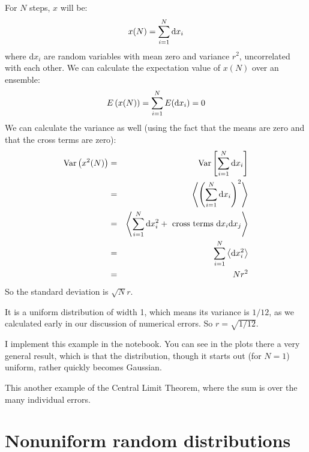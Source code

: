 
\begin{answer}
  For $N$ steps, $x$ will be:
  \begin{equation}
    x(N) = \sum_{i=1}^{N} {\rm d}x_i
  \end{equation}
  where d$x_i$ are random variables with mean zero and variance $r^2$,
  uncorrelated with each other. We can calculate the expectation value
  of $x(N)$ over an ensemble:
  \begin{equation}
    E\left(x(N)\right) = \sum_{i=1}^{N} E({\rm d}x_i) = 0
  \end{equation}
  We can calculate the variance as well (using the fact that the means
  are zero and that the cross terms are zero):
  \begin{eqnarray}
    {\rm Var}\left(x^2(N)\right)
    &=& {\rm Var}\left[\sum_{i=1}^{N} {\rm d}x_i\right] \cr
    &=& \left\langle\left(\sum_{i=1}^{N} {\rm
      d}x_i\right)^2\right\rangle \cr
    &=& \left\langle\sum_{i=1}^{N} {\rm d}x_i^2 + {\rm
        ~cross~terms~d}x_i{\rm d}x_j \right\rangle \cr
    &=& \sum_{i=1}^{N} \left\langle {\rm d}x_i^2 \right\rangle \cr
    &=& N r^2
  \end{eqnarray}
  So the standard deviation is $\sqrt{N} r$.
\end{answer}


\begin{answer}
It is a uniform distribution of width 1, which means its variance is
$1/12$, as we calculated early in our discussion of numerical
errors. So $r= \sqrt{1/12}$.
\end{answer}

I implement this example in the notebook. You can see in the plots
there a very general result, which is that the distribution, though it
starts out (for $N=1$) uniform, rather quickly becomes Gaussian.


\begin{answer}
This another example of the Central Limit Theorem, where the sum is
over the many individual errors.
\end{answer}

\section{Nonuniform random distributions}


